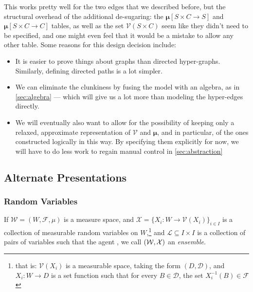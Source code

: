 \documentclass{article}
\newcommand\bmu{\boldsymbol{\mu}}
\begin{document}
	This works pretty well for the two edges that we described before, but the structural overhead of the additional de-sugaring: the $\boldsymbol\mu[S\times C\to S]$ and $\boldsymbol\mu[S\times C\to C]$ tables, as well as the set $\mathcal V(S \times C)$ seem like they didn't need to be specified, and one might even feel that it would be a mistake to allow any other table. Some reasons for this design decision include:
	\begin{itemize}[nosep]
		\item It is easier to prove things about graphs than directed hyper-graphs. Similarly, defining directed paths is a lot simpler.
		\item We can eliminate the clunkiness by fusing the model with an algebra, as in \cref{sec:algebra} --- which will give us a lot more than modeling the hyper-edges directly.
		\item We will eventually also want to allow for the possibility of keeping only a relaxed, approximate representation of $\mathcal V$ and $\bmu$, and in particular, of the ones constructed logically in this way. By specifying them explicitly for now, we will have to do less work to regain manual control in \cref{sec:abstraction}
	\end{itemize}

	\subsection{Alternate Presentations}
	\subsubsection{Random Variables}
	If $\mathcal W = (W, \mathcal F, \mu)$ is a measure space, and $\mathcal X = \{ X_i: W \to \mathcal V(X_i) \}_{i \in I} $ is a collection of measurable random variables on $W$,\footnote{that is: $\mathcal V(X_i)$ is a measurable space, taking the form $(D, \mathcal D)$, and $X_i : W \to D$ is a set function such that for every $B \in \mathcal D$, the set $X_i^{-1}(B) \in \mathcal F$} and 
	{\color{gray}$\mathcal L \subseteq I \times I$ is a collection of pairs of variables such that the agent } 
	, we call $(\cal W, X)$ an \emph{ensemble}.
	
\end{document}
